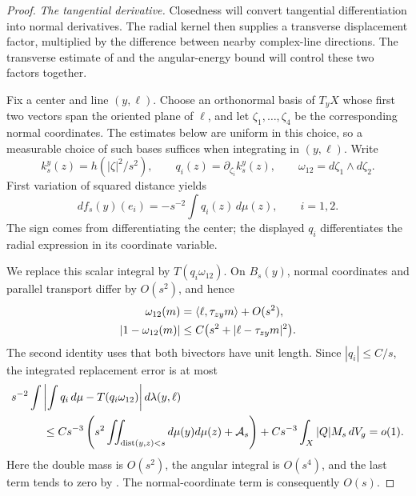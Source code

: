 \begin{proof}
\smallskip
\noindent\emph{The tangential derivative.}
Closedness will convert tangential differentiation into normal
derivatives. The radial kernel then supplies a transverse displacement
factor, multiplied by the difference between nearby complex-line
directions. The transverse estimate of 
and the angular-energy bound will control these two factors together.

Fix a center and line \((y,\ell)\).  Choose an orthonormal basis of
\(T_yX\) whose first two vectors span the oriented plane of \(\ell\),
and let \(\zeta_1,\ldots,\zeta_4\) be the corresponding normal
coordinates.  The estimates below are uniform in this choice, so a
measurable choice of such bases suffices when integrating in
\((y,\ell)\).  Write
\[
 k_s^y(z)=h(|\zeta|^2/s^2),\qquad
 q_i(z)=\partial_{\zeta_i}k_s^y(z),\qquad
 \omega_{12}=d\zeta_1\wedge d\zeta_2.
\]
First variation of squared distance yields
\begin{equation}\label{eq:density-first-variation}
 df_s(y)(e_i)=-s^{-2}\int q_i(z)\,d\mu(z),
 \qquad i=1,2.
\end{equation}
The sign comes from differentiating the center; the displayed
\(q_i\) differentiates the radial expression in its coordinate
variable.

We replace this scalar integral by \(T(q_i\omega_{12})\).
On \(B_s(y)\), normal coordinates and parallel transport differ by
\(O(s^2)\), and hence
\begin{align}
 \omega_{12}(m)
 &=\langle\ell,\tau_{zy}m\rangle+O(s^2),\notag\\
 |1-\omega_{12}(m)|
 &\le C\bigl(s^2+|\ell-\tau_{zy}m|^2\bigr).
 \label{eq:density-tangent-form-error}
\end{align}
The second identity uses that both bivectors have unit length.
Since \(|q_i|\le C/s\), the integrated replacement error is at most
\begin{align}
 &s^{-2}\int
 \left|\int q_i\,d\mu-T(q_i\omega_{12})\right|d\lambda(y,\ell)
 \notag\\
 &\hspace{1cm}\le
 Cs^{-3}\left(
 s^2\iint_{\operatorname{dist}(y,z)<s}d\mu(y)d\mu(z)+\mathcal A_s\right)
 +Cs^{-3}\int_X|Q|M_s\,dV_g
 =o(1).
 \label{eq:density-replacement-error}
\end{align}
Here the double mass is \(O(s^2)\), the angular integral is \(O(s^4)\),
and the last term tends to zero by .
The normal-coordinate term is consequently \(O(s)\).


\end{proof}
